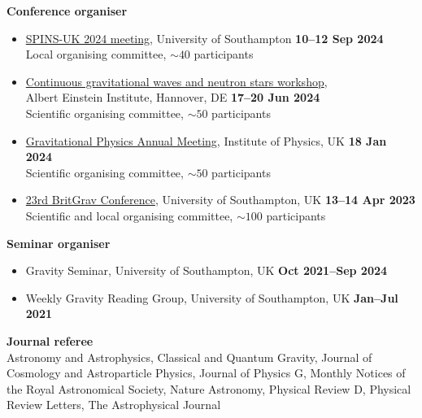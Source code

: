 \documentclass[%
    margin,
    line,
    11pt,
]{res}
\begin{document}
\begin{resume}
\newpage

\textbf{Conference organiser}
\vspace*{0.05in}
\begin{itemize}
    \item[]
    \href{https://sites.google.com/view/spins-uk-2024}{SPINS-UK 2024 meeting},
    University of Southampton
    \hfill \textbf{10--12 Sep 2024} \\
    \hspace*{1em} Local organising committee, $\sim 40$ participants
    \item[]
    \href{https://plan.events.mpg.de/event/133}%
    {Continuous gravitational waves and neutron stars workshop}, \\
    Albert Einstein Institute, Hannover, DE \hfill \textbf{17--20 Jun 2024}\\
    \hspace*{1em} Scientific organising committee, $\sim 50$ participants
    \item[]
    \href{https://iop.eventsair.com/gpm2024/}%
    {Gravitational Physics Annual Meeting},
    Institute of Physics, UK \hfill \textbf{18 Jan 2024} \\
    \hspace*{1em} Scientific organising committee, $\sim 50$ participants
    \item[]
    \href{https://sites.google.com/view/britgrav23}{23rd BritGrav Conference},
    University of Southampton, UK \hfill \textbf{13--14 Apr 2023} \\
    \hspace*{1em} Scientific and local organising committee,
    $\sim 100$ participants
\end{itemize}

\textbf{Seminar organiser}
\vspace*{0.05in}
\begin{itemize}
    \item[] Gravity Seminar, University of Southampton, UK
    \hfill \textbf{Oct 2021--Sep 2024}
    \item[] Weekly Gravity Reading Group, University of Southampton, UK
    \hfill \textbf{Jan--Jul 2021}
\end{itemize}

\textbf{Journal referee}
\vspace*{0.05in} \\
\hspace*{1em}
Astronomy and Astrophysics,
Classical and Quantum Gravity,
Journal of Cosmology and Astroparticle Physics,
Journal of Physics G,
Monthly Notices of the Royal Astronomical Society,
Nature Astronomy,
Physical Review D,
Physical Review Letters,
The Astrophysical Journal


\end{resume}
\end{document}
